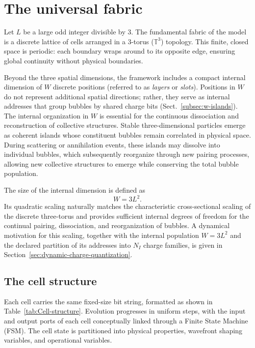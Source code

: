 \documentclass{ijuc}
\begin{document}
\section{The universal fabric}
\label{sec:space-and-time}

Let $L$ be a large odd integer divisible by 3. The fundamental fabric of the model is a discrete lattice of cells arranged in a 3-torus ($\mathbb{T}^3$) topology. This finite, closed space is periodic: each boundary wraps around to its opposite edge, ensuring global continuity without physical boundaries.

Beyond the three spatial dimensions, the framework includes a compact internal dimension of $W$ discrete positions (referred to as \emph{layers} or \emph{slots}). Positions in $W$ do not represent additional spatial directions; rather, they serve as internal addresses that group bubbles by shared charge bits (Sect.~\ref{subsec:w-islands}). The internal organization in $W$ is essential for the continuous dissociation and reconstruction of collective structures. Stable three-dimensional particles emerge as coherent islands whose constituent bubbles remain correlated in physical space. During scattering or annihilation events, these islands may dissolve into individual bubbles, which subsequently reorganize through new pairing processes, allowing new collective structures to emerge while conserving the total bubble population.

The size of the internal dimension is defined as
\begin{equation}
W = 3L^2.
\end{equation}
Its quadratic scaling naturally matches the characteristic cross-sectional scaling of the discrete three-torus and provides sufficient internal degrees of freedom for the continual pairing, dissociation, and reorganization of bubbles. A dynamical motivation for this scaling, together with the internal population $W=3L^2$ and the declared partition of its addresses into $N_I$ charge families, is given in Section~\ref{sec:dynamic-charge-quantization}.

\subsection{The cell structure}
\label{subsec:The-cell-structure}

Each cell carries the same fixed-size bit string, formatted as shown in Table~\ref{tab:Cell-structure}. Evolution progresses in uniform steps, with the input and output ports of each cell conceptually linked through a Finite State Machine (FSM). The cell state is partitioned into physical properties, wavefront shaping variables, and operational variables.
\end{document}
